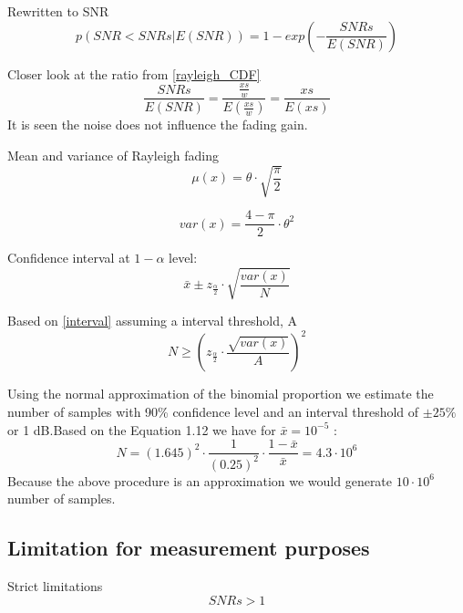 Rewritten to SNR
\begin{equation}\label{rayleigh_CDF}
p(SNR < SNRs | E\left(SNR\right)) = 1-exp\left(-\frac{SNRs}{E\left(SNR\right)}\right)
\end{equation}

Closer look at the ratio from \autoref{rayleigh_CDF}
\begin{equation}
\frac{SNRs}{E\left(SNR\right)} = \frac{\frac{xs}{w}}{E\left(\frac{xs}{w}\right)} = \frac{xs}{E\left(xs\right)} 
\end{equation}
It is seen the noise does not influence the fading gain. %

Mean and variance of Rayleigh fading
\begin{equation}
\mu(x) = \theta\cdot\sqrt{\frac{\pi}{2}}
\end{equation}

\begin{equation}\label{rayleigh_var}
var(x) = \frac{4-\pi}{2}\cdot \theta^2
\end{equation}


Confidence interval at $1-\alpha$ level:
\begin{equation}\label{interval}
\bar{x} \pm z_{\frac{\alpha}{2}} \cdot \sqrt{\frac{var(x)}{N}}
\end{equation}

Based on \autoref{interval} assuming a interval threshold, A
\begin{equation}\label{interval2}
N \geq \left(z_{\frac{\alpha}{2}} \cdot \frac{\sqrt{var(x)}}{A} \right)^2
\end{equation}

Using the normal approximation of the binomial proportion we  estimate the number of samples with 90\% confidence level and an interval threshold of $\pm 25\%$ or 1 dB.Based on the Equation 1.12 we have for $ \bar{x} = 10^{-5} $ :
\begin{equation}\label{sampleEQ}
N=(1.645)^{2} \cdot \frac{1}{(0.25)^{2}} \cdot \frac{1-\bar{x}}{\bar{x}} = 4.3 \cdot 10^{6}
\end{equation}
Because the above procedure is an approximation we would generate $ 10 \cdot 10^{6} $ number of samples.
\subsection{Limitation for measurement purposes}

Strict limitations
\begin{equation}
SNRs > 1
\end{equation}

